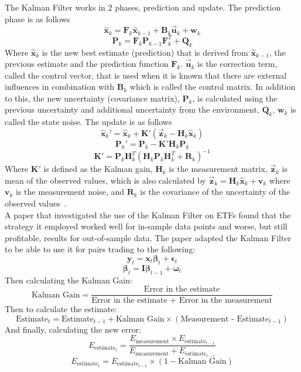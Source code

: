 The Kalman Filter works in 2 phases, prediction and update. The prediction phase is as follows $$\hat{\mathbf{x}}_k = \mathbf{F}_k \hat{\mathbf{x}}_{k-1} + \mathbf{B}_k \overset{\rightarrow}{\mathbf{u}}_k + \mathbf{w}_k$$ $$\mathbf{P}_k = \mathbf{F}_k \mathbf{P}_{k-1} \mathbf{F}_k^T + \mathbf{Q}_k $$ Where $\hat{\mathbf{x}}_k$ is the new best estimate (prediction) that is derived from $\hat{\mathbf{x}}_{k-1}$, the previous estimate and the prediction function $\mathbf{F}_k$. $\overset{\rightarrow}{\mathbf{u}}_k$ is the correction term, called the control vector, that is used when it is known that there are external influences in combination with $\mathbf{B}_k$ which is called the control matrix. In addition to this, the new uncertainty (covariance matrix), $\mathbf{P}_k$, is calculated using the previous uncertainty and additional uncertainty from the environment, $\mathbf{Q}_k $, $\mathbf{w}_k$ is called the state noise. The update is as follows $$\hat{\mathbf{x}}_k' = \hat{\mathbf{x}}_k + \mathbf{K}'(\overset{\rightarrow}{\mathbf{z}}_k - \mathbf{H}_k \hat{\mathbf{x}}_k)$$ $$\mathbf{P}_k' = \mathbf{P}_k - \mathbf{K}'\mathbf{H}_k \mathbf{P}_k$$ $$\mathbf{K}' = \mathbf{P}_k \mathbf{H}_k^T (\mathbf{H}_k \mathbf{P}_k \mathbf{H}_k^T + \mathbf{R}_k)^{-1}$$ Where $\mathbf{K}'$ is defined as the Kalman gain, $\mathbf{H}_k$ is the measurement matrix, $\overset{\rightarrow}{\mathbf{z}}_k$ is mean of the observed values, which is also calculated by $\overset{\rightarrow}{\mathbf{z}}_k = \mathbf{H}_k \hat{\mathbf{x}}_k + \mathbf{v}_k$ where $\mathbf{v}_k$ is the measurement noise, and $\mathbf{R}_k$ is the covariance of the uncertainty of the observed values~\cite{kalman_filter_bzarg}.
\\[5mm]
A paper that investigated the use of the Kalman Filter on ETFs found that the strategy it employed worked well for in-sample data points and worse, but still profitable, results for out-of-sample data. The paper adapted the Kalman Filter to be able to use it for pairs trading to the following: $$\mathbf{y}_t = \mathbf{x}_t \mathbf{\beta}_t + \mathbf{\epsilon}_t$$ $$\mathbf{\beta}_t = \mathbf{I} \mathbf{\beta}_{t-1} + \mathbf{\omega}_t$$ Then calculating the Kalman Gain: $$\text{Kalman Gain} = \frac{\text{Error in the estimate}}{\text{Error in the estimate + Error in the measurement}}$$ Then to calculate the estimate: $$\text{Estimate}_t = \text{Estimate}_{t-1} + \text{Kalman Gain} \times (\text{Measurement - }\text{Estimate}_{t-1})$$ And finally, calculating the new error: $$E_{\text{estimate}_t} = \frac{E_{\text{measurement}} \times E_{\text{estimate}_{t-1}}}{E_{\text{measurement}} + E_{\text{estimate}_{t-1}}}$$ $$E_{\text{estimate}_t} = E_{\text{estimate}_{t-1}} \times (1 - \text{Kalman Gain})$$

